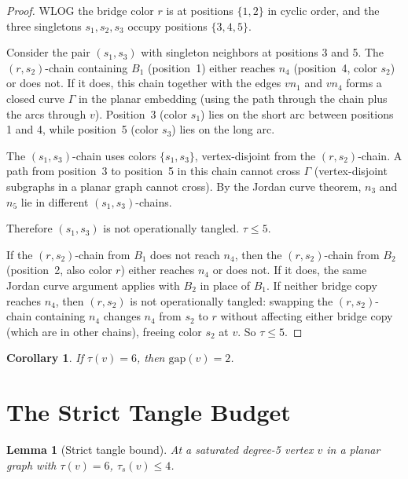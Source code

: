 \documentclass[11pt]{article}
\newtheorem{lemma}[theorem]{Lemma}
\newtheorem{corollary}[theorem]{Corollary}
\theoremstyle{remark}
\begin{document}
\begin{proof}
WLOG the bridge color $r$ is at positions $\{1, 2\}$ in cyclic order, and the three singletons $s_1, s_2, s_3$ occupy positions $\{3, 4, 5\}$.

Consider the pair $(s_1, s_3)$ with singleton neighbors at positions 3 and 5. The $(r, s_2)$-chain containing $B_1$ (position~1) either reaches $n_4$ (position~4, color $s_2$) or does not. If it does, this chain together with the edges $vn_1$ and $vn_4$ forms a closed curve $\Gamma$ in the planar embedding (using the path through the chain plus the arcs through $v$). Position~3 (color $s_1$) lies on the short arc between positions 1 and 4, while position~5 (color $s_3$) lies on the long arc.

The $(s_1, s_3)$-chain uses colors $\{s_1, s_3\}$, vertex-disjoint from the $(r, s_2)$-chain. A path from position~3 to position~5 in this chain cannot cross $\Gamma$ (vertex-disjoint subgraphs in a planar graph cannot cross). By the Jordan curve theorem, $n_3$ and $n_5$ lie in different $(s_1, s_3)$-chains.

Therefore $(s_1, s_3)$ is not operationally tangled. $\tau \leq 5$.

If the $(r, s_2)$-chain from $B_1$ does not reach $n_4$, then the $(r, s_2)$-chain from $B_2$ (position~2, also color $r$) either reaches $n_4$ or does not. If it does, the same Jordan curve argument applies with $B_2$ in place of $B_1$. If neither bridge copy reaches $n_4$, then $(r, s_2)$ is not operationally tangled: swapping the $(r, s_2)$-chain containing $n_4$ changes $n_4$ from $s_2$ to $r$ without affecting either bridge copy (which are in other chains), freeing color $s_2$ at $v$. So $\tau \leq 5$.
\end{proof}

\begin{corollary}
If $\tau(v) = 6$, then $\mathrm{gap}(v) = 2$.
\end{corollary}

\section{The Strict Tangle Budget}

\begin{lemma}[Strict tangle bound]
At a saturated degree-5 vertex $v$ in a planar graph with $\tau(v) = 6$, $\tau_s(v) \leq 4$.
\end{lemma}
\end{document}
